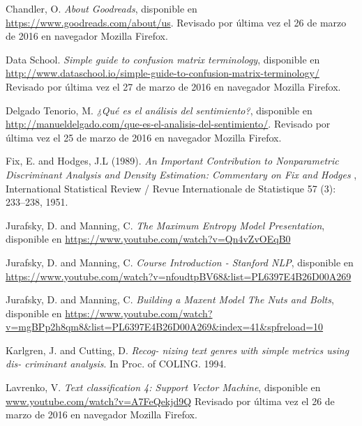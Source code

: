 \documentclass[hidelinks]{sig-alternate-05-2015}
\begin{document}
\begin{thebibliography}{1}



 Chandler, O. \emph{About Goodreads}, disponible en \url{https://www.goodreads.com/about/us}. Revisado por última vez el 26 de marzo de 2016 en navegador Mozilla Firefox.

 Data School. \emph{Simple guide to confusion matrix terminology},  disponible en
\url{http://www.dataschool.io/simple-guide-to-confusion-matrix-terminology/} Revisado por última vez el 27 de marzo de 2016 en navegador Mozilla Firefox.

 Delgado Tenorio, M. \emph{¿Qué es el análisis del sentimiento?},  disponible en \url{http://manueldelgado.com/que-es-el-analisis-del-sentimiento/}. Revisado por última vez el 25 de marzo de 2016 en navegador Mozilla Firefox.

 Fix, E. and Hodges, J.L (1989). \emph{ An Important Contribution to Nonparametric Discriminant Analysis and Density Estimation: Commentary on Fix and Hodges }, International Statistical Review / Revue Internationale de Statistique 57 (3): 233–238, 1951.

 Jurafsky, D. and Manning, C. \emph{The Maximum Entropy Model Presentation}, disponible en \url{https://www.youtube.com/watch?v=Qn4vZvOEqB0}

 Jurafsky, D. and Manning, C. \emph{Course Introduction - Stanford NLP}, disponible en \url{https://www.youtube.com/watch?v=nfoudtpBV68&list=PL6397E4B26D00A269}

 Jurafsky, D. and  Manning, C. \emph{Building a Maxent Model The Nuts and Bolts}, disponible en  \url{https://www.youtube.com/watch?v=mgBPp2h8qm8\&list=PL6397E4B26D00A269\&index=41\&spfreload=10}

 Karlgren, J. and Cutting, D. \emph{Recog- nizing text genres with simple metrics using dis- criminant analysis}. In Proc. of COLING. 1994. 

 Lavrenko, V. \emph{Text classification 4: Support Vector Machine}, disponible en \url{www.youtube.com/watch?v=A7FeQekjd9Q} Revisado por última vez el 26 de marzo de 2016 en navegador Mozilla Firefox.


\end{thebibliography}
\end{document}
